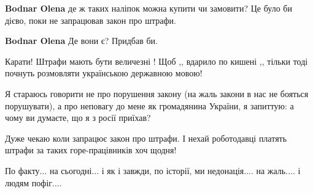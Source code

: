 \begin{itemize}
\begin{itemize}
\textbf{Bodnar Olena} де ж таких наліпок можна купити чи замовити? Це було би дієво, поки не запрацював закон про штрафи.

 
\textbf{Bodnar Olena} Де вони є? Придбав би.
\end{itemize}

 
Карати! Штрафи мають бути величезні ! Щоб ,, вдарило по кишені ,, тільки тоді почнуть розмовляти українською державною мовою!

 

Я стараюсь говорити не про порушення закону (на жаль закони в нас не бояться
порушувати), а про неповагу до мене як громадянина України, я запиттую: а чому
ви думаєте, що я з росії приїхав?


 
Дуже чекаю коли запрацює закон про штрафи. І нехай роботодавці платять штрафи
за таких горе-працівників хоч щодня!

 
По факту... на сьогодні... і як і завжди, по історії, ми недонація.... на жаль.... і людям пофіг....

 

\end{itemize}
